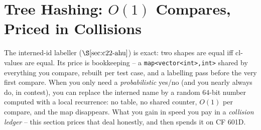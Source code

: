 \section{Tree Hashing: \(O(1)\) Compares, Priced in Collisions}\label{sec:c22-hash}

\begin{previouslybox}
The interned-id labeller (\(\secref{c22-ahu}\)) is exact: two shapes are equal iff
\(\mathrm{cl}\)-values are equal.  Its price is bookkeeping -- a
\texttt{map<vector<int>,int>} shared by everything you compare, rebuilt per test
case, and a labelling pass before the very first compare.  When you only need a
\emph{probabilistic} yes/no (and you nearly always do, in contest), you can replace
the interned name by a random \(64\)-bit number computed with a local recurrence:
no table, no shared counter, \(O(1)\) per compare, and the map disappears.  What
you gain in speed you pay in a \emph{collision ledger} -- this section prices that
deal honestly, and then spends it on CF 601D.
\end{previouslybox}

